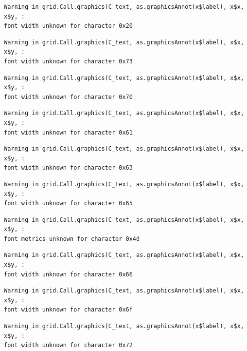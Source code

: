 \documentclass[
  letterpaper,
]{scrbook}
\begin{document}
\begin{verbatim}
Warning in grid.Call.graphics(C_text, as.graphicsAnnot(x$label), x$x, x$y, :
font width unknown for character 0x20
\end{verbatim}

\begin{verbatim}
Warning in grid.Call.graphics(C_text, as.graphicsAnnot(x$label), x$x, x$y, :
font width unknown for character 0x73
\end{verbatim}

\begin{verbatim}
Warning in grid.Call.graphics(C_text, as.graphicsAnnot(x$label), x$x, x$y, :
font width unknown for character 0x70
\end{verbatim}

\begin{verbatim}
Warning in grid.Call.graphics(C_text, as.graphicsAnnot(x$label), x$x, x$y, :
font width unknown for character 0x61
\end{verbatim}

\begin{verbatim}
Warning in grid.Call.graphics(C_text, as.graphicsAnnot(x$label), x$x, x$y, :
font width unknown for character 0x63
\end{verbatim}

\begin{verbatim}
Warning in grid.Call.graphics(C_text, as.graphicsAnnot(x$label), x$x, x$y, :
font width unknown for character 0x65
\end{verbatim}

\begin{verbatim}
Warning in grid.Call.graphics(C_text, as.graphicsAnnot(x$label), x$x, x$y, :
font metrics unknown for character 0x4d
\end{verbatim}

\begin{verbatim}
Warning in grid.Call.graphics(C_text, as.graphicsAnnot(x$label), x$x, x$y, :
font width unknown for character 0x66
\end{verbatim}

\begin{verbatim}
Warning in grid.Call.graphics(C_text, as.graphicsAnnot(x$label), x$x, x$y, :
font width unknown for character 0x6f
\end{verbatim}

\begin{verbatim}
Warning in grid.Call.graphics(C_text, as.graphicsAnnot(x$label), x$x, x$y, :
font width unknown for character 0x72
\end{verbatim}
\end{document}
